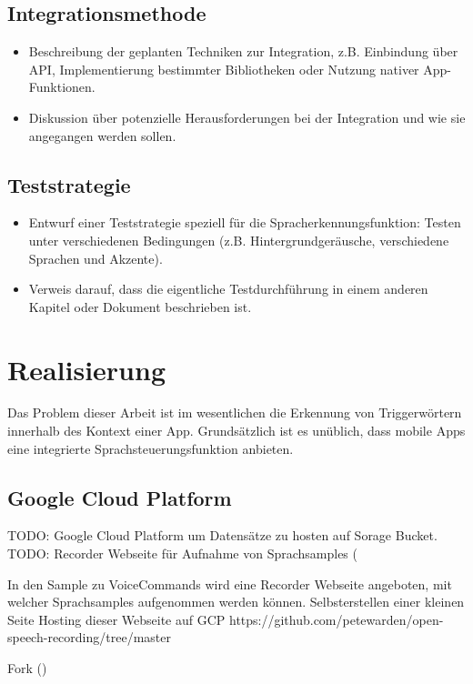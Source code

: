 \documentclass[11pt,a4paper]{article}
\begin{document}
\subsection{Integrationsmethode}
\begin{itemize}
    \item Beschreibung der geplanten Techniken zur Integration, z.B. Einbindung über API, Implementierung bestimmter Bibliotheken oder Nutzung nativer App-Funktionen.
    \item Diskussion über potenzielle Herausforderungen bei der Integration und wie sie angegangen werden sollen.
\end{itemize}

\subsection{Teststrategie}
\begin{itemize}
    \item Entwurf einer Teststrategie speziell für die Spracherkennungsfunktion: Testen unter verschiedenen Bedingungen (z.B. Hintergrundgeräusche, verschiedene Sprachen und Akzente).
    \item Verweis darauf, dass die eigentliche Testdurchführung in einem anderen Kapitel oder Dokument beschrieben ist.
\end{itemize}

\newpage \section{Realisierung}
Das Problem dieser Arbeit ist im wesentlichen die Erkennung von Triggerwörtern innerhalb
des Kontext einer App. Grundsätzlich ist es unüblich, dass mobile Apps eine
integrierte Sprachsteuerungsfunktion anbieten.


\subsection{Google Cloud Platform}
TODO: Google Cloud Platform um Datensätze zu hosten auf Sorage Bucket. 
TODO: Recorder Webseite für Aufnahme von Sprachsamples
(\cite{warden2018speech}

In den Sample zu VoiceCommands wird eine Recorder Webseite angeboten, mit welcher Sprachsamples
aufgenommen werden können. Selbsterstellen einer kleinen Seite Hosting dieser Webseite auf GCP
https://github.com/petewarden/open-speech-recording/tree/master

Fork 
(\cite{warden2018speech})
\end{document}
